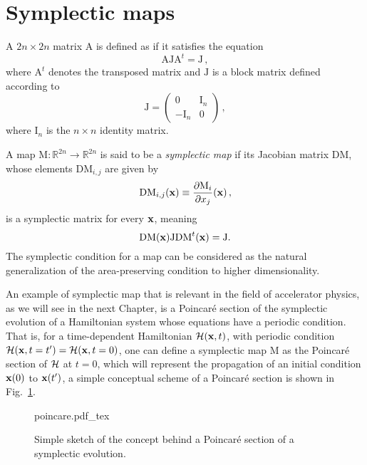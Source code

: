 \section{Symplectic maps}

A $2n \times 2n$ matrix $\mathrm{A}$ is defined as  if it satisfies the equation
\begin{equation}
    \mathrm{A} \mathrm{J} \mathrm{A}^t=\mathrm{J} \,,
\end{equation}
where $\mathrm{A}^t$ denotes the transposed matrix and $\mathrm{J}$ is a block matrix defined according to
\begin{equation}
    \mathrm{J}=\left(\begin{array}{cc}
        0 & \mathrm{I}_n \\
        -\mathrm{I}_n & 0 
    \end{array}\right) \,,
\end{equation}
where $\mathrm{I}_n$ is the $n\times n$ identity matrix.

A map $\mathrm{M}: \mathbb{R}^{2n} \rightarrow \mathbb{R}^{2n}$ is said to be a \textit{symplectic map} if its Jacobian matrix $\mathrm{DM}$, whose elements $\mathrm{DM}_{i, j}$ are given by
\begin{equation}
    \mathrm{DM}_{i, j}(\vb{x}) \equiv \frac{\partial \mathrm{M}_i}{\partial x_j}(\vb{x}) \,,
\end{equation}
is a symplectic matrix for every $\vb{x}$, meaning
\begin{equation}
    \mathrm{DM}(\vb{x}) \mathrm{J} \mathrm{DM}^t(\vb{x})=\mathrm{J} .
\end{equation}
The symplectic condition for a map can be considered as the natural generalization of
the area-preserving condition to higher dimensionality.

An example of symplectic map that is relevant in the field of accelerator physics,  as we will see in the next Chapter, is a Poincaré section of the symplectic evolution of a Hamiltonian system whose equations have a periodic condition. That is, for a time-dependent Hamiltonian $\mathcal{H}(\vb{x}, t)$, with periodic condition $\mathcal{H}(\vb{x}, t=t') = \mathcal{H}(\vb{x}, t=0)$, one can define a symplectic map $\mathrm{M}$ as the Poincaré section of $\mathcal{H}$ at $t=0$, which will represent the propagation of an initial condition $\vb{x}(0)$ to $\vb{x}(t')$, a simple conceptual scheme of a Poincaré section is shown in Fig.~\ref{fig:poincare}. 

\begin{figure}
	\centering
	\def\svgwidth{0.5\columnwidth}
    {poincare.pdf_tex}
    \caption{Simple sketch of the concept behind a Poincaré section of a symplectic evolution.}
    \label{fig:poincare}
\end{figure}

